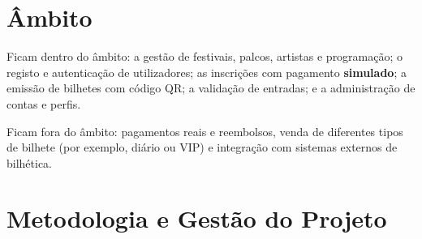 \section{Âmbito}

Ficam dentro do âmbito: a gestão de festivais, palcos, artistas e programação;
o registo e autenticação de utilizadores; as inscrições com pagamento
\textbf{simulado}; a emissão de bilhetes com código QR; a validação de entradas;
e a administração de contas e perfis.

Ficam fora do âmbito: pagamentos reais e reembolsos, venda de diferentes tipos
de bilhete (por exemplo, diário ou VIP) e integração com sistemas externos de
bilhética.

\section{Metodologia e Gestão do Projeto}

